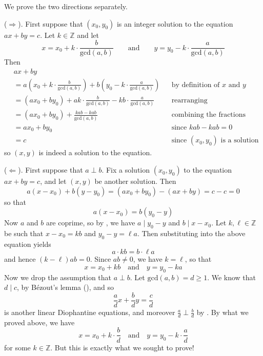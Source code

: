 \begin{cproof}
We prove the two directions separately.

($\Rightarrow$). First suppose that $(x_0,y_0)$ is an integer solution to the equation $ax+by=c$. Let $k \in \mathbb{Z}$ and let
\[ x = x_0 + k \cdot \frac{b}{\mathrm{gcd}(a,b)} \qquad \text{and} \qquad y = y_0 - k \cdot \frac{a}{\mathrm{gcd}(a,b)} \]
Then
\begin{align*}
& ax+by && \\
&= a \left( x_0 + k \cdot \frac{b}{\mathrm{gcd}(a,b)} \right) + b \left( y_0 - k \cdot \frac{a}{\mathrm{gcd}(a,b)} \right) && \text{by definition of $x$ and $y$} \\
&= (ax_0 + by_0) + ak \cdot \frac{b}{\mathrm{gcd}(a,b)} - kb \cdot \frac{a}{\mathrm{gcd}(a,b)} && \text{rearranging} \\
&= (ax_0 + by_0) + \frac{kab-kab}{\mathrm{gcd}(a,b)} && \text{combining the fractions} \\
&= ax_0 + by_0 && \text{since $kab-kab=0$} \\
&= c && \text{since $(x_0,y_0)$ is a solution}
\end{align*}
so $(x,y)$ is indeed a solution to the equation.

($\Leftarrow$). First suppose that $a \perp b$. Fix a solution $(x_0,y_0)$ to the equation $ax+by=c$, and let $(x,y)$ be another solution. Then
\[ a(x-x_0) + b(y-y_0) = (ax_0 + by_0) - (ax+by) = c-c = 0 \]
so that
\[ a(x-x_0) = b(y_0-y) \]
Now $a$ and $b$ are coprime, so by , we have $a \mid y_0-y$ and $b \mid x-x_0$. Let $k,\ell \in \mathbb{Z}$ be such that $x-x_0=kb$ and $y_0-y = \ell a$.
Then substituting into the above equation yields
\[ a \cdot k b = b \cdot \ell a \]
and hence $(k-\ell)ab = 0$. Since $ab \ne 0$, we have $k=\ell$, so that
\[ x = x_0 + kb \quad \text{and} \quad y = y_0-ka \]
Now we drop the assumption that $a \perp b$. Let $\mathrm{gcd}(a,b) = d \ge 1$. We know that $d \mid c$, by B\'{e}zout's lemma (), and so 
\[ \frac{a}{d} x + \frac{b}{d} y = \frac{c}{d} \]
is another linear Diophantine equations, and moreover $\frac{a}{d} \perp \frac{b}{d}$ by . By what we proved above, we have
\[ x = x_0 + k \cdot \frac{b}{d} \quad \text{and} \quad y=y_0-k \cdot \frac{a}{d} \]
for some $k \in \mathbb{Z}$. But this is exactly what we sought to prove!
\end{cproof}

